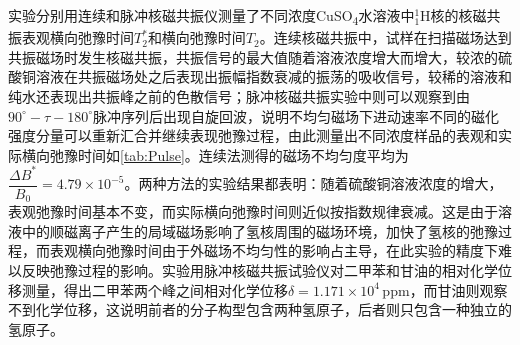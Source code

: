\par 实验分别用连续和脉冲核磁共振仪测量了不同浓度CuSO\textsubscript{4}水溶液中$^1_1$H核的核磁共振表观横向弛豫时间$T_2^*$和横向弛豫时间$T_2$。连续核磁共振中，试样在扫描磁场达到共振磁场时发生核磁共振，共振信号的最大值随着溶液浓度增大而增大，较浓的硫酸铜溶液在共振磁场处之后表现出振幅指数衰减的振荡的吸收信号，较稀的溶液和纯水还表现出共振峰之前的色散信号；脉冲核磁共振实验中则可以观察到由$90^{\circ}-\tau -180^{\circ}$脉冲序列后出现自旋回波，说明不均匀磁场下进动速率不同的磁化强度分量可以重新汇合并继续表现弛豫过程，由此测量出不同浓度样品的表观和实际横向弛豫时间如\cref{tab:Pulse}。连续法测得的磁场不均匀度平均为$\dfrac{\Delta B^*}{B_0}=4.79\times 10^{-5}$。两种方法的实验结果都表明：随着硫酸铜溶液浓度的增大，表观弛豫时间基本不变，而实际横向弛豫时间则近似按指数规律衰减。这是由于溶液中的顺磁离子产生的局域磁场影响了氢核周围的磁场环境，加快了氢核的弛豫过程，而表观横向弛豫时间由于外磁场不均匀性的影响占主导，在此实验的精度下难以反映弛豫过程的影响。实验用脉冲核磁共振试验仪对二甲苯和甘油的相对化学位移测量，得出二甲苯两个峰之间相对化学位移$\delta =1.171\times 10^{4}\,\mathrm{ppm}$，而甘油则观察不到化学位移，这说明前者的分子构型包含两种氢原子，后者则只包含一种独立的氢原子。